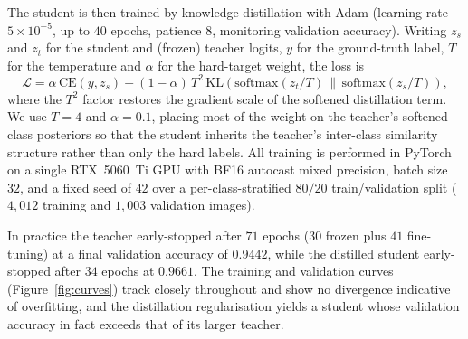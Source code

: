 The student is then trained by knowledge distillation \citep{hinton2015distilling} with Adam (learning rate $5\times10^{-5}$, up to $40$ epochs, patience $8$, monitoring validation accuracy). Writing $z_s$ and $z_t$ for the student and (frozen) teacher logits, $y$ for the ground-truth label, $T$ for the temperature and $\alpha$ for the hard-target weight, the loss is
\begin{equation}
\mathcal{L} = \alpha\,\mathrm{CE}\!\left(y, z_s\right) + (1-\alpha)\,T^{2}\,\mathrm{KL}\!\left(\mathrm{softmax}\!\left(z_t/T\right)\,\big\|\,\mathrm{softmax}\!\left(z_s/T\right)\right),
\end{equation}
where the $T^{2}$ factor restores the gradient scale of the softened distillation term. We use $T=4$ and $\alpha=0.1$, placing most of the weight on the teacher's softened class posteriors so that the student inherits the teacher's inter-class similarity structure rather than only the hard labels. All training is performed in PyTorch on a single RTX~5060~Ti GPU with BF16 autocast mixed precision, batch size $32$, and a fixed seed of $42$ over a per-class-stratified $80/20$ train/validation split ($4{,}012$ training and $1{,}003$ validation images).

In practice the teacher early-stopped after $71$ epochs ($30$ frozen plus $41$ fine-tuning) at a final validation accuracy of $0.9442$, while the distilled student early-stopped after $34$ epochs at $0.9661$. The training and validation curves (Figure~\ref{fig:curves}) track closely throughout and show no divergence indicative of overfitting, and the distillation regularisation yields a student whose validation accuracy in fact exceeds that of its larger teacher.